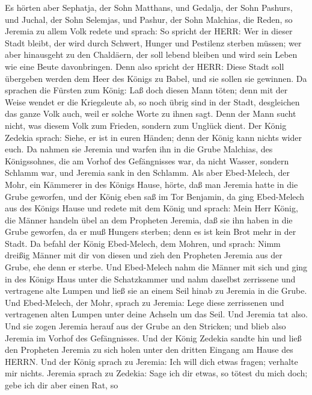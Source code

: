  Es hörten aber Sephatja, der Sohn Matthans, und Gedalja,
der Sohn Pashurs, und Juchal, der Sohn Selemjas, und Pashur, der Sohn
Malchias, die Reden, so Jeremia zu allem Volk redete und sprach:
 So spricht der HERR: Wer in dieser Stadt bleibt, der wird
durch Schwert, Hunger und Pestilenz sterben müssen; wer aber hinausgeht
zu den Chaldäern, der soll lebend bleiben und wird sein Leben wie eine
Beute davonbringen.  Denn also spricht der HERR: Diese Stadt
soll übergeben werden dem Heer des Königs zu Babel, und sie sollen sie
gewinnen.  Da sprachen die Fürsten zum König: Laß doch
diesen Mann töten; denn mit der Weise wendet er die Kriegsleute ab, so
noch übrig sind in der Stadt, desgleichen das ganze Volk auch, weil er
solche Worte zu ihnen sagt. Denn der Mann sucht nicht, was diesem Volk
zum Frieden, sondern zum Unglück dient.  Der König Zedekia
sprach: Siehe, er ist in euren Händen; denn der König kann nichts wider
euch.  Da nahmen sie Jeremia und warfen ihn in die Grube
Malchias, des Königssohnes, die am Vorhof des Gefängnisses war, da nicht
Wasser, sondern Schlamm war, und Jeremia sank in den Schlamm.
 Als aber Ebed-Melech, der Mohr, ein Kämmerer in des Königs
Hause, hörte, daß man Jeremia hatte in die Grube geworfen, und der König
eben saß im Tor Benjamin,  da ging Ebed-Melech aus des
Königs Hause und redete mit dem König und sprach:  Mein Herr
König, die Männer handeln übel an dem Propheten Jeremia, daß sie ihn
haben in die Grube geworfen, da er muß Hungers sterben; denn es ist kein
Brot mehr in der Stadt.  Da befahl der König Ebed-Melech,
dem Mohren, und sprach: Nimm dreißig Männer mit dir von diesen und zieh
den Propheten Jeremia aus der Grube, ehe denn er sterbe. 
Und Ebed-Melech nahm die Männer mit sich und ging in des Königs Haus
unter die Schatzkammer und nahm daselbst zerrissene und vertragene alte
Lumpen und ließ sie an einem Seil hinab zu Jeremia in die Grube.
 Und Ebed-Melech, der Mohr, sprach zu Jeremia: Lege diese
zerrissenen und vertragenen alten Lumpen unter deine Achseln um das
Seil. Und Jeremia tat also.  Und sie zogen Jeremia herauf
aus der Grube an den Stricken; und blieb also Jeremia im Vorhof des
Gefängnisses.  Und der König Zedekia sandte hin und ließ
den Propheten Jeremia zu sich holen unter den dritten Eingang am Hause
des HERRN. Und der König sprach zu Jeremia: Ich will dich etwas fragen;
verhalte mir nichts.  Jeremia sprach zu Zedekia: Sage ich
dir etwas, so tötest du mich doch; gebe ich dir aber einen Rat, so
